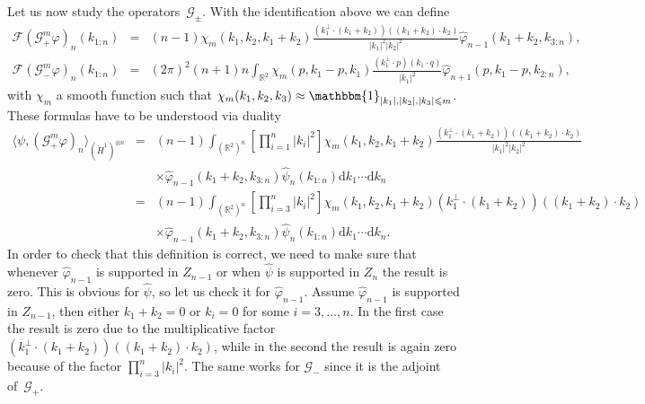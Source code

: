 \documentclass[10pt]{article}
\newcommand{\mathd}{\mathrm{d}}
\begin{document}
Let us now study the operators~$\mathcal{G}_{\pm}$. With the identification
above we can define
\[ \begin{array}{lll}
     \mathcal{F} (\mathcal{G}_+^m \varphi)_n (k_{1 : n}) & = & (n - 1) \chi_m
     (k_1, k_2, k_1 + k_2) \frac{(k_1^{\perp} \cdot (k_1 + k_2)) ((k_1 + k_2)
     \cdot k_2)}{| k_1 |^2 | k_2 |^2} \hat{\varphi}_{n - 1} (k_1 + k_2, k_{3 :
     n}),\\
     \mathcal{F} (\mathcal{G}_-^m \varphi)_n (k_{1 : n}) & = & (2 \pi)^2 (n +
     1) n \int_{\mathbb{R}^2} \chi_m (p, k_1 - p, k_1) \frac{(k_1^{\perp}
     \cdot p) (k_1 \cdot q)}{| k_1 |^2} \hat{\varphi}_{n + 1} (p, k_1 - p,
     k_{2 : n}),
   \end{array} \]
with $\chi_m$ a smooth function such that $\chi_m (k_1, k_2, k_3) \approx
\mathbbm{1}_{| k_1 |, | k_2 |, | k_3 | \leqslant m}$. These formulas have to
be understood via duality
\begin{eqnarray*}
  \langle \psi, (\mathcal{G}_+^m \varphi)_n \rangle_{(\dot{H}^1)^{\otimes n}}
  & = & (n - 1) \int_{(\mathbb{R}^2)^n} \left[ \prod_{i = 1}^n | k_i |^2
  \right] \chi_m (k_1, k_2, k_1 + k_2)  \frac{(k_1^{\perp} \cdot (k_1 + k_2))
  ((k_1 + k_2) \cdot k_2)}{| k_1 |^2 | k_2 |^2} \\
  &  & \times \hat{\varphi}_{n - 1} (k_1 + k_2, k_{3 : n})  \hat{\psi}_n
  (k_{1 : n}) \mathd k_1 \cdots \mathd k_n\\
  & = & (n - 1) \int_{(\mathbb{R}^2)^n} \left[ \prod_{i = 3}^n | k_i |^2
  \right] \chi_m (k_1, k_2, k_1 + k_2)  (k_1^{\perp} \cdot (k_1 + k_2)) ((k_1
  + k_2) \cdot k_2)\\
  &  & \times \hat{\varphi}_{n - 1} (k_1 + k_2, k_{3 : n})  \hat{\psi}_n
  (k_{1 : n}) \mathd k_1 \cdots \mathd k_n .
\end{eqnarray*}
In order to check that this definition is correct, we need to make sure that
whenever $\hat{\varphi}_{n - 1}$ is supported in $Z_{n - 1}$ or when
$\hat{\psi}$ is supported in $Z_n$ the result is zero. This is obvious for
$\hat{\psi}$, so let us check it for $\hat{\varphi}_{n - 1}$. Assume
$\hat{\varphi}_{n - 1}$ is supported in $Z_{n - 1}$, then either $k_1 + k_2 =
0$ or $k_i = 0$ for some $i = 3, \ldots, n$. In the first case the result is
zero due to the multiplicative factor $(k_1^{\perp} \cdot (k_1 + k_2)) ((k_1 +
k_2) \cdot k_2)$, while in the second the result is again zero because of the
factor $\prod_{i = 3}^n | k_i |^2$. The same works for $\mathcal{G}_-$ since
it is the adjoint of~$\mathcal{G}_+$.
\end{document}
